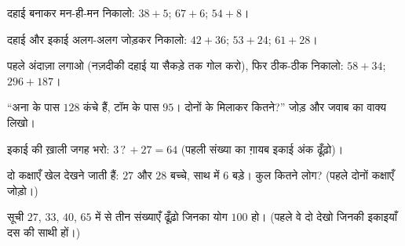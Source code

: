\begin{exercise}[$\star$]\label{exo:g2:addition:4}
दहाई बनाकर मन-ही-मन निकालो: $38 + 5$; \quad $67 + 6$;
\quad $54 + 8$।
\end{exercise}

\begin{exercise}[$\star$]\label{exo:g2:addition:5}
दहाई और इकाई अलग-अलग जोड़कर निकालो: $42 + 36$; \quad
$53 + 24$; \quad $61 + 28$।
\end{exercise}

\begin{exercise}[$\star$]\label{exo:g2:addition:6}
पहले अंदाज़ा लगाओ (नज़दीकी दहाई या सैकड़े तक गोल करो), फिर ठीक-ठीक
निकालो: $58 + 34$; \quad $296 + 187$।
\end{exercise}

\begin{exercise}[$\star$]\label{exo:g2:addition:7}
``अना के पास $128$ कंचे हैं, टॉम के पास $95$। दोनों के मिलाकर
कितने?'' जोड़ और जवाब का वाक्य लिखो।
\end{exercise}

\begin{exercise}[$\star$]\label{exo:g2:addition:8}
इकाई की ख़ाली जगह भरो: $3\,?\, + 27 = 64$ (पहली संख्या का ग़ायब
इकाई अंक ढूँढ़ो)।
\end{exercise}

\begin{exercise}[$\star$]\label{exo:g2:addition:9}
दो कक्षाएँ खेल देखने जाती हैं: $27$ और $28$ बच्चे, साथ में $6$
बड़े। कुल कितने लोग? (पहले दोनों कक्षाएँ जोड़ो।)
\end{exercise}

\begin{exercise}[$\star\star$]\label{exo:g2:addition:10}
सूची $27$, $33$, $40$, $65$ में से तीन संख्याएँ ढूँढ़ो जिनका योग
$100$ हो। (पहले वे दो देखो जिनकी इकाइयाँ दस की साथी हों।)
\end{exercise}
